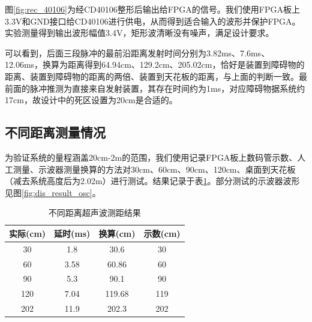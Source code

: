 \documentclass[a4paper, twocolumn]{ctexart}
\begin{document}
图\ref{fig:rec_40106}为经CD40106整形后输出给FPGA的信号。我们使用FPGA板上3.3V和GND接口给CD40106进行供电，从而得到适合输入的波形并保护FPGA。实验测量得到输出波形幅值3.4V，矩形波清晰没有噪声，满足设计要求。

可以看到，后面三段脉冲的最前沿距离发射时间分别为3.82ms、7.6ms、12.06ms，换算为距离得到64.94cm、129.2cm、205.02cm，恰好是装置到障碍物的距离、装置到障碍物的距离的两倍、装置到天花板的距离，与上面的判断一致。最前面的脉冲推测为直接来自发射装置，其存在时间约为1ms，对应障碍物据系统约17cm，故设计中的死区设置为20cm是合适的。

\subsection{不同距离测量情况}

为验证系统的量程涵盖20cm-2m的范围，我们使用记录FPGA板上数码管示数、人工测量、示波器测量换算的方法对30cm、60cm、90cm、120cm、桌面到天花板（减去系统高度后为2.02m）进行测试。结果记录于表\ref{tab:dis_result}。部分测试的示波器波形见图\ref{fig:dis_result_osc}。

\begin{table}[ht]
    \centering
    \caption{不同距离超声波测距结果}
    \label{tab:dis_result}
    \begin{tabular}{cccc}
        \toprule
        实际(cm) & 延时(ms) & 换算(cm) & 示数(cm) \\
        \midrule
        30       & 1.8      & 30.6     & 30       \\
        60       & 3.58     & 60.86    & 60       \\
        90       & 5.3      & 90.1     & 90       \\
        120      & 7.04     & 119.68   & 119      \\
        202      & 11.9     & 202.3    & 202      \\
        \bottomrule
    \end{tabular}
\end{table}
\end{document}
